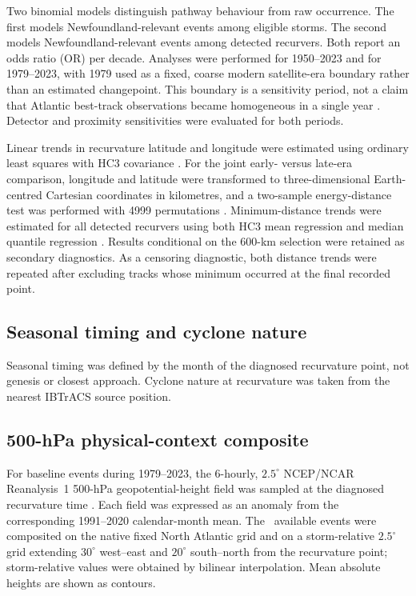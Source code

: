 \documentclass[11pt]{article}
\begin{document}
Two binomial models distinguish pathway behaviour from raw occurrence. The first models Newfoundland-relevant events among eligible storms. The second models Newfoundland-relevant events among detected recurvers. Both report an odds ratio (OR) per decade. Analyses were performed for 1950--2023 and for 1979--2023, with 1979 used as a fixed, coarse modern satellite-era boundary rather than an estimated changepoint. This boundary is a sensitivity period, not a claim that Atlantic best-track observations became homogeneous in a single year \citep{VecchiKnutson2008,LandseaFranklin2013}. Detector and proximity sensitivities were evaluated for both periods.

Linear trends in recurvature latitude and longitude were estimated using ordinary least squares with HC3 covariance \citep{MacKinnonWhite1985}. For the joint early- versus late-era comparison, longitude and latitude were transformed to three-dimensional Earth-centred Cartesian coordinates in kilometres, and a two-sample energy-distance test was performed with 4999 permutations \citep{SzekelyRizzo2013}. Minimum-distance trends were estimated for all detected recurvers using both HC3 mean regression and median quantile regression \citep{KoenkerBassett1978}. Results conditional on the 600-km selection were retained as secondary diagnostics. As a censoring diagnostic, both distance trends were repeated after excluding tracks whose minimum occurred at the final recorded point.

\subsection{Seasonal timing and cyclone nature}
Seasonal timing was defined by the month of the diagnosed recurvature point, not genesis or closest approach. Cyclone nature at recurvature was taken from the nearest IBTrACS source position.

\subsection{500-hPa physical-context composite}
For baseline events during 1979--2023, the 6-hourly, \(2.5^\circ\) NCEP/NCAR Reanalysis~1 500-hPa geopotential-height field was sampled at the diagnosed recurvature time \citep{Kalnay1996}. Each field was expressed as an anomaly from the corresponding 1991--2020 calendar-month mean. The \SatelliteN\ available events were composited on the native fixed North Atlantic grid and on a storm-relative \(2.5^\circ\) grid extending \(30^\circ\) west--east and \(20^\circ\) south--north from the recurvature point; storm-relative values were obtained by bilinear interpolation. Mean absolute heights are shown as contours.
\end{document}
